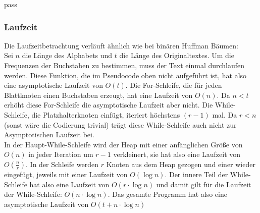 pass\documentclass[a4paper,10pt,ngerman]{scrartcl}
\begin{document}
    \subsubsection{Laufzeit}
    Die Laufzeitbetrachtung verläuft ähnlich wie bei binären Huffman Bäumen\autocite{noauthor_huffman-kodierung_2025}:\\
    Sei $n$ die Länge des Alphabets und $t$ die Länge des Originaltextes.
    Um die Frequenzen der Buchstaben zu bestimmen, muss der Text einmal durchlaufen werden.
    Diese Funktion, die im Pseudocode oben nicht aufgeführt ist, hat also eine asymptotische Laufzeit von $O(t)$.
    Die For-Schleife, die für jeden Blattknoten einen Buchstaben erzeugt, hat eine Laufzeit von $O(n)$. Da $n < t$ erhöht diese For-Schleife die asymptotische Laufzeit aber nicht.
    Die While-Schleife, die Platzhalterknoten einfügt, iteriert höchstens $(r-1)$ mal. Da $r < n$ (sonst wäre die Codierung trivial) trägt diese While-Schleife auch nicht zur Asymptotischen Laufzeit bei.\\
    In der Haupt-While-Schleife wird der Heap mit einer anfänglichen Größe von $O(n)$ in jeder Iteration um $r-1$ verkleinert, sie hat also eine Laufzeit von $O(\frac n r)$.
    In der Schleife werden $r$ Knoten aus dem Heap gezogen und einer wieder eingefügt, jeweils mit einer Laufzeit von $O(\log n)$.
    Der innere Teil der While-Schleife hat also eine Laufzeit von $O(r \cdot \log n)$ und damit gilt für die Laufzeit der While-Schleife: $O(n \cdot \log n)$.
    Das gesamte Programm hat also eine asymptotische Laufzeit von $O(t + n \cdot \log n)$
\end{document}
